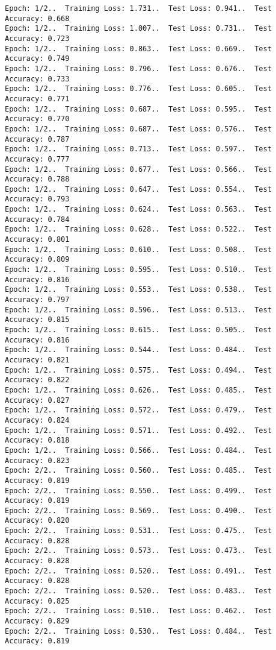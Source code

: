 \documentclass[11pt]{article}
\begin{document}
    \begin{Verbatim}[commandchars=\\\{\}]
Epoch: 1/2..  Training Loss: 1.731..  Test Loss: 0.941..  Test Accuracy: 0.668
Epoch: 1/2..  Training Loss: 1.007..  Test Loss: 0.731..  Test Accuracy: 0.723
Epoch: 1/2..  Training Loss: 0.863..  Test Loss: 0.669..  Test Accuracy: 0.749
Epoch: 1/2..  Training Loss: 0.796..  Test Loss: 0.676..  Test Accuracy: 0.733
Epoch: 1/2..  Training Loss: 0.776..  Test Loss: 0.605..  Test Accuracy: 0.771
Epoch: 1/2..  Training Loss: 0.687..  Test Loss: 0.595..  Test Accuracy: 0.770
Epoch: 1/2..  Training Loss: 0.687..  Test Loss: 0.576..  Test Accuracy: 0.787
Epoch: 1/2..  Training Loss: 0.713..  Test Loss: 0.597..  Test Accuracy: 0.777
Epoch: 1/2..  Training Loss: 0.677..  Test Loss: 0.566..  Test Accuracy: 0.788
Epoch: 1/2..  Training Loss: 0.647..  Test Loss: 0.554..  Test Accuracy: 0.793
Epoch: 1/2..  Training Loss: 0.624..  Test Loss: 0.563..  Test Accuracy: 0.784
Epoch: 1/2..  Training Loss: 0.628..  Test Loss: 0.522..  Test Accuracy: 0.801
Epoch: 1/2..  Training Loss: 0.610..  Test Loss: 0.508..  Test Accuracy: 0.809
Epoch: 1/2..  Training Loss: 0.595..  Test Loss: 0.510..  Test Accuracy: 0.816
Epoch: 1/2..  Training Loss: 0.553..  Test Loss: 0.538..  Test Accuracy: 0.797
Epoch: 1/2..  Training Loss: 0.596..  Test Loss: 0.513..  Test Accuracy: 0.815
Epoch: 1/2..  Training Loss: 0.615..  Test Loss: 0.505..  Test Accuracy: 0.816
Epoch: 1/2..  Training Loss: 0.544..  Test Loss: 0.484..  Test Accuracy: 0.821
Epoch: 1/2..  Training Loss: 0.575..  Test Loss: 0.494..  Test Accuracy: 0.822
Epoch: 1/2..  Training Loss: 0.626..  Test Loss: 0.485..  Test Accuracy: 0.827
Epoch: 1/2..  Training Loss: 0.572..  Test Loss: 0.479..  Test Accuracy: 0.824
Epoch: 1/2..  Training Loss: 0.571..  Test Loss: 0.492..  Test Accuracy: 0.818
Epoch: 1/2..  Training Loss: 0.566..  Test Loss: 0.484..  Test Accuracy: 0.823
Epoch: 2/2..  Training Loss: 0.560..  Test Loss: 0.485..  Test Accuracy: 0.819
Epoch: 2/2..  Training Loss: 0.550..  Test Loss: 0.499..  Test Accuracy: 0.819
Epoch: 2/2..  Training Loss: 0.569..  Test Loss: 0.490..  Test Accuracy: 0.820
Epoch: 2/2..  Training Loss: 0.531..  Test Loss: 0.475..  Test Accuracy: 0.828
Epoch: 2/2..  Training Loss: 0.573..  Test Loss: 0.473..  Test Accuracy: 0.828
Epoch: 2/2..  Training Loss: 0.520..  Test Loss: 0.491..  Test Accuracy: 0.828
Epoch: 2/2..  Training Loss: 0.520..  Test Loss: 0.483..  Test Accuracy: 0.825
Epoch: 2/2..  Training Loss: 0.510..  Test Loss: 0.462..  Test Accuracy: 0.829
Epoch: 2/2..  Training Loss: 0.530..  Test Loss: 0.484..  Test Accuracy: 0.819

\end{Verbatim}
\end{document}
